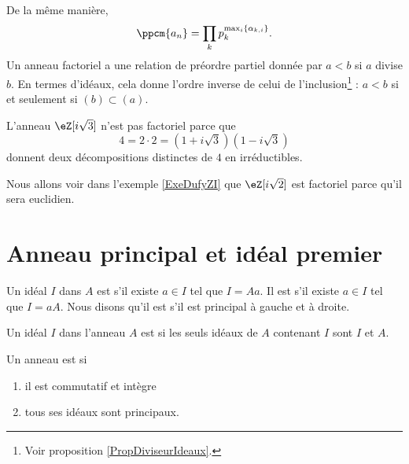 De la même manière,
\begin{equation}
    \ppcm\{ a_n \}=\prod_kp_k^{\max_i\{ \alpha_{k,i} \}}.
\end{equation}
Un anneau factoriel a une relation de préordre partiel donnée par \( a<b\) si \( a\) divise \( b\). En termes d'idéaux, cela donne l'ordre inverse de celui de l'inclusion\footnote{Voir proposition \ref{PropDiviseurIdeaux}.} : \( a<b\) si et seulement si \( (b)\subset (a)\).

\begin{example} \label{EXooCWJUooCDJqkr}
    L'anneau \( \eZ[i\sqrt{3}]\) n'est pas factoriel parce que
    \begin{equation}
        4=2\cdot 2=(1+i\sqrt{3})(1-i\sqrt{3})
    \end{equation}
    donnent deux décompositions distinctes de \( 4\) en irréductibles.
\end{example}

Nous allons voir dans l'exemple \ref{ExeDufyZI} que \( \eZ[i\sqrt{2}]\) est factoriel parce qu'il sera euclidien.

\section{Anneau principal et idéal premier}

\begin{definition} 
    Un idéal \( I\) dans \( A\) est  s'il existe \( a\in I\) tel que \( I= A a\). Il est  s'il existe \( a\in I\) tel que \( I=a A\). Nous disons qu'il est  s'il est principal à gauche et à droite.
    
    Un idéal \( I\) dans l'anneau \( A\) est  si les seuls idéaux de \( A\) contenant \( I\) sont \( I\) et \( A\).
\end{definition}

\begin{definition}          \label{DEFooGWOZooXzUlhK}
    Un anneau est  si 
    \begin{enumerate}
        \item
            il est commutatif et intègre
        \item
            tous ses idéaux sont principaux.
    \end{enumerate}
\end{definition}


